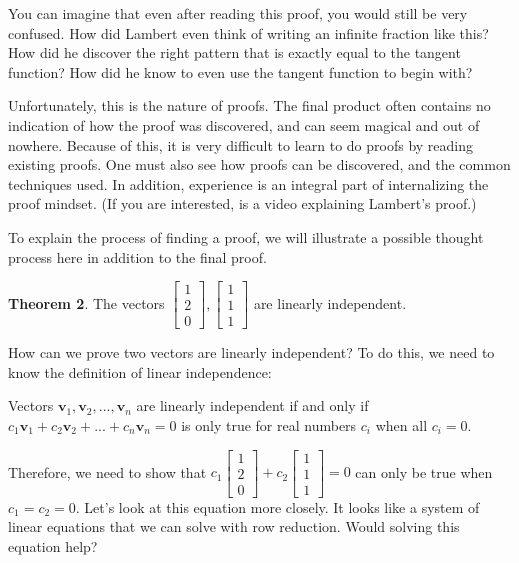 \documentclass[11pt]{article}
\begin{document}
    You can imagine that even after reading this proof, you would still be very confused.
    How did Lambert even think of writing an infinite fraction like this? How did he
    discover the right pattern that is exactly equal to the tangent function? How did
    he know to even use the tangent function to begin with?
    
    Unfortunately, this is the nature of proofs. The final product often contains no
    indication of how the proof was discovered, and can seem magical and out of nowhere.
    Because of this, it is very difficult to learn to do proofs by reading existing proofs.
    One must also see how proofs can be discovered, and the common techniques used.
    In addition, experience is an integral part of internalizing the proof mindset.
    (If you are interested, \href{https://youtu.be/Lk_QF_hcM8A}{\color{blue}{here}} is a video explaining Lambert's proof.)
    

    To explain the process of finding a proof, we will illustrate a possible thought
    process here in addition to the final proof.
    
    \textbf{Theorem 2}. The vectors $\begin{bmatrix}1 \\ 2 \\ 0\end{bmatrix},
    \begin{bmatrix}1 \\ 1 \\ 1\end{bmatrix}$ are linearly independent.
    
    How can we prove two vectors are linearly independent? To do this, we need to
    know the definition of linear independence:
    
    Vectors $\mathbf v_1,\mathbf v_2,...,\mathbf v_n$ are linearly independent if
    and only if $c_1\mathbf v_1+c_2\mathbf v_2+...+c_n\mathbf v_n=0$ is only true
    for real numbers $c_i$ when all $c_i=0$.
    
    Therefore, we need to show that $c_1\begin{bmatrix}1 \\ 2 \\ 0\end{bmatrix}+
    c_2\begin{bmatrix}1 \\ 1 \\ 1\end{bmatrix}=0$ can only be true when $c_1=c_2=0$.
    Let's look at this equation more closely. It looks like a system of linear equations
    that we can solve with row reduction. Would solving this equation help?
    
\end{document}
